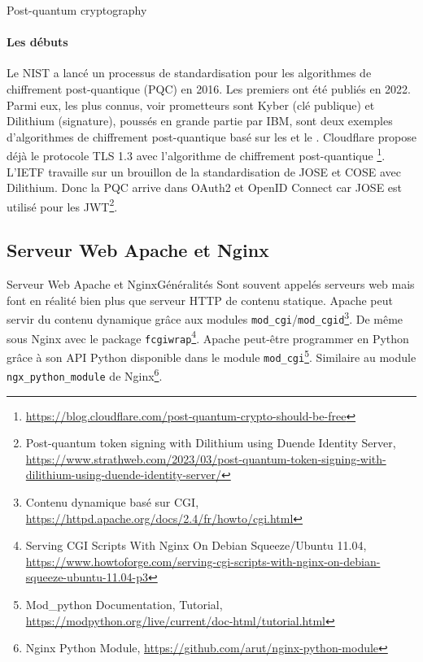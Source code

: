 \documentclass{beamer}
\begin{document}
    \begin{frame}{Post-quantum cryptography}
        \framesubtitle{Les débuts}
        \begin{footnotesize}
            \transdissolve
            Le NIST a lancé un processus de standardisation pour les algorithmes de chiffrement post-quantique (PQC) en 2016.
            Les premiers ont été publiés en 2022.
            Parmi eux, les plus connus, voir prometteurs sont Kyber (clé publique) et Dilithium (signature), poussés en grande partie par IBM, sont deux exemples d'algorithmes de chiffrement post-quantique basé sur les  et le .
            \bigbreak
            Cloudflare propose déjà le protocole TLS 1.3 avec l'algorithme de chiffrement post-quantique \footnote{\url{https://blog.cloudflare.com/post-quantum-crypto-should-be-free}}.
            \bigbreak
            L'IETF travaille sur un brouillon de la standardisation de JOSE et COSE avec Dilithium.
            Donc la PQC arrive dans OAuth2 et OpenID Connect car JOSE est utilisé pour les JWT\footnote{Post-quantum token signing with Dilithium using Duende Identity Server, \url{https://www.strathweb.com/2023/03/post-quantum-token-signing-with-dilithium-using-duende-identity-server/}}.
        \end{footnotesize}
    \end{frame}

    \subsection{Serveur Web Apache et Nginx}\label{subsec:apache-nginx-web-server}
    \begin{frame}{Serveur Web Apache et Nginx}{Généralités}
        Sont souvent appelés serveurs web mais font en réalité bien plus que serveur HTTP de contenu statique.
        \bigbreak
        Apache peut servir du contenu dynamique grâce aux modules \lstinline{mod_cgi}/\lstinline{mod_cgid}\footnote{Contenu dynamique basé sur CGI, \url{https://httpd.apache.org/docs/2.4/fr/howto/cgi.html}}.
        De même sous Nginx avec le package \lstinline{fcgiwrap}\footnote{Serving CGI Scripts With Nginx On Debian Squeeze/Ubuntu 11.04, \url{https://www.howtoforge.com/serving-cgi-scripts-with-nginx-on-debian-squeeze-ubuntu-11.04-p3}}.
        \bigbreak
        Apache peut-être programmer en Python grâce à son API Python disponible dans le module \lstinline{mod_cgi}\footnote{Mod\_python Documentation, Tutorial, \url{https://modpython.org/live/current/doc-html/tutorial.html}}.
        Similaire au module \lstinline{ngx_python_module} de Nginx\footnote{Nginx Python Module, \url{https://github.com/arut/nginx-python-module}}.
        \setlength\parindent{0pt}
    \end{frame}
\end{document}
